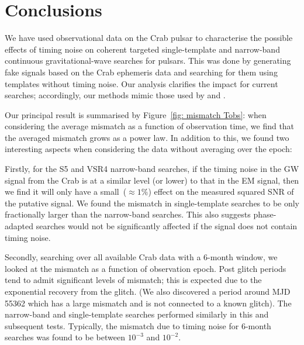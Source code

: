 \documentclass[../full_thesis/full_thesis.tex]{subfiles}
\begin{document}

\section{Conclusions}
\label{sec: narrow-band conclusions}
We have used observational data on the Crab pulsar to characterise the possible
effects of timing noise on coherent targeted single-template  and narrow-band
continuous gravitational-wave searches for pulsars.  This was done by generating fake
signals based on the Crab ephemeris data and searching for them using templates
without timing noise. Our analysis clarifies the impact for current searches;
accordingly, our methods mimic those used by \citet{abbott2008beating} and \citet{aasi2015narrow}.

Our principal result is summarised by Figure~\ref{fig: mismatch Tobs}:
when considering the average mismatch as
a function of observation time,  we find that the averaged
mismatch grows as a power law. In addition to this, we found two interesting
aspects when considering the data without averaging over the epoch:

Firstly, for the S5 and VSR4 narrow-band searches, if the timing noise in the
GW signal from the Crab is at a similar level (or lower) to that in the EM
signal, then we find it will only have a small~($\approx1\%$) effect on the
measured squared SNR of the putative signal.  We found the mismatch in
single-template searches to be only fractionally larger than the narrow-band
searches.  This also suggests phase-adapted searches would not be significantly
affected if the signal does not contain timing noise.

Secondly, searching over all available Crab data with a 6-month window, we
looked at the mismatch as a function of observation epoch. Post glitch periods
tend to admit significant levels of mismatch; this is expected due to the
exponential recovery from the glitch. (We also discovered a period around MJD
55362 which has a large mismatch and is not connected to a known glitch). The
narrow-band and single-template searches performed similarly in this and
subsequent tests. Typically, the mismatch due to timing noise for 6-month
searches was found to be between $10^{-3}$ and $10^{-2}$.
\end{document}
